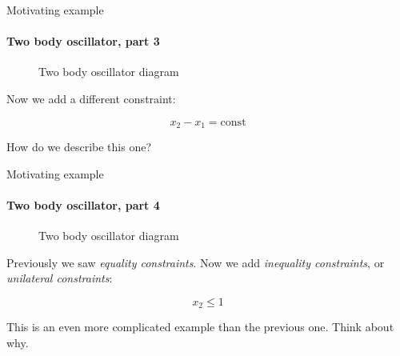 \documentclass{beamer}
\begin{document}
\begin{frame}{Motivating example}
\framesubtitle{Two body oscillator, part 3}
\begin{flushleft}

\begin{figure}
    \centering
    
    \caption{Two body oscillator diagram}
\end{figure}

Now we add a different constraint:

\begin{equation}
x_2 - x_1 = \text{const}
\end{equation}

How do we describe this one?

\end{flushleft}
\end{frame}




\begin{frame}{Motivating example}
\framesubtitle{Two body oscillator, part 4}
\begin{flushleft}

\begin{figure}
    \centering
    
    \caption{Two body oscillator diagram}
\end{figure}

Previously we saw \emph{equality constraints}. Now we add \emph{inequality constraints}, or \emph{unilateral constraints}:

\begin{equation}
x_2 \leq 1
\end{equation}

This is an even more complicated example than the previous one. Think about why.

\end{flushleft}
\end{frame}
\end{document}

